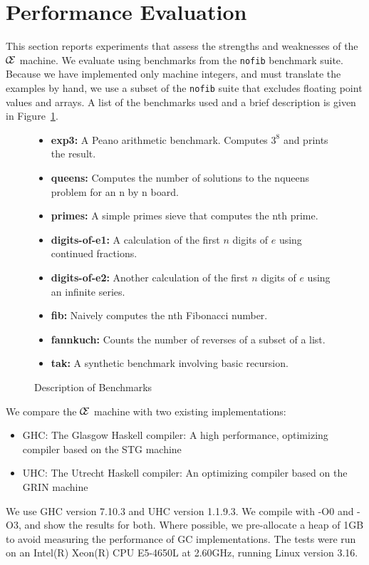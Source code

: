 \section{Performance Evaluation} \label{sec:eval}

This section reports experiments that assess the strengths and weaknesses of
the $\mathcal{\mathcal{C} \mskip -4mu \mathcal{E}}$ machine. We evaluate using benchmarks from the \texttt{nofib}
benchmark suite. Because we have implemented only machine integers, and must
translate the examples by hand, we use a subset of the \texttt{nofib} suite that
excludes floating point values and arrays. A list of the benchmarks used and a
brief description is given in Figure~\ref{fig:bench}.

\begin{figure}
\begin{itemize}
\item \textbf{exp3:} A Peano arithmetic benchmark. Computes $3^8$ and prints the result. 
\item \textbf{queens:} Computes the number of solutions to the nqueens problem
for an n by n board.
\item \textbf{primes:} A simple primes sieve that computes the nth prime.
\item \textbf{digits-of-e1:} A calculation of the first $n$ digits of $e$ using
continued fractions. 
\item \textbf{digits-of-e2:} Another calculation of the first $n$ digits of $e$ using an
infinite series.  
\item \textbf{fib:} Naively computes the nth Fibonacci number.
\item \textbf{fannkuch:} Counts the number of reverses of a subset of a list.
\item \textbf{tak:} A synthetic benchmark involving basic recursion.
\end{itemize}
\caption{Description of Benchmarks}
\label{fig:bench}
\end{figure}

We compare the $\mathcal{\mathcal{C} \mskip -4mu \mathcal{E}}$ machine with two existing implementations:

\begin{itemize}
\item GHC: The Glasgow Haskell compiler: A high performance, optimizing compiler
based on the STG machine~\cite{jonesstg}
\item UHC: The Utrecht Haskell compiler: An optimizing compiler based on the
GRIN machine~\cite{boquist1997grin,dijkstra2009architecture}
\end{itemize}

We use GHC version 7.10.3 and UHC version 1.1.9.3. We compile with -O0 and -O3,
and show the results for both. Where possible, we pre-allocate a heap of 1GB 
to avoid measuring the performance of GC implementations. The tests were run on
an Intel(R) Xeon(R) CPU E5-4650L at 2.60GHz, running Linux version 3.16. 
